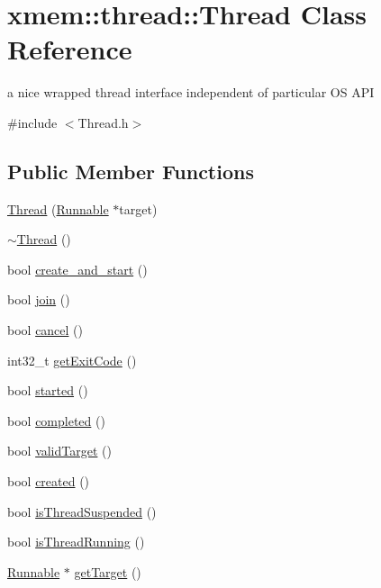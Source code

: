 \hypertarget{classxmem_1_1thread_1_1_thread}{\section{xmem\-:\-:thread\-:\-:Thread Class Reference}
\label{classxmem_1_1thread_1_1_thread}
}


a nice wrapped thread interface independent of particular O\-S A\-P\-I  




{\ttfamily \#include $<$Thread.\-h$>$}

\subsection*{Public Member Functions}
\begin{DoxyCompactItemize}
\item 
\hyperlink{classxmem_1_1thread_1_1_thread_a3248f8f92c293da9c20b78f443e61d76}{Thread} (\hyperlink{classxmem_1_1thread_1_1_runnable}{Runnable} $\ast$target)
\item 
\hyperlink{classxmem_1_1thread_1_1_thread_a37d9edd3a1a776cbc27dedff949c9726}{$\sim$\-Thread} ()
\item 
bool \hyperlink{classxmem_1_1thread_1_1_thread_a7550e894f4a83043fe4a4e93aee2def6}{create\-\_\-and\-\_\-start} ()
\item 
bool \hyperlink{classxmem_1_1thread_1_1_thread_a6d767b9746588b8be5f274f4da454b08}{join} ()
\item 
bool \hyperlink{classxmem_1_1thread_1_1_thread_a5d52b4357af2956e10fd72d80d540cf1}{cancel} ()
\item 
int32\-\_\-t \hyperlink{classxmem_1_1thread_1_1_thread_a6557774d3e8cf0bd92e8ba372cd23b85}{get\-Exit\-Code} ()
\item 
bool \hyperlink{classxmem_1_1thread_1_1_thread_a453a8b976b95c33d94b07fbca2ac414a}{started} ()
\item 
bool \hyperlink{classxmem_1_1thread_1_1_thread_a6d6ccbf6832d66803c6a527bad3943d8}{completed} ()
\item 
bool \hyperlink{classxmem_1_1thread_1_1_thread_ab91a2a9e8beb035106ba2d46ab32153c}{valid\-Target} ()
\item 
bool \hyperlink{classxmem_1_1thread_1_1_thread_a6a5f80bf0bca5ea5b18246aa2b1af250}{created} ()
\item 
bool \hyperlink{classxmem_1_1thread_1_1_thread_ab5c96a075727d5ffbec86213517a1795}{is\-Thread\-Suspended} ()
\item 
bool \hyperlink{classxmem_1_1thread_1_1_thread_afd810140b83b3a2ad90a425ea92dc366}{is\-Thread\-Running} ()
\item 
\hyperlink{classxmem_1_1thread_1_1_runnable}{Runnable} $\ast$ \hyperlink{classxmem_1_1thread_1_1_thread_a0cb4d94dd3f3d885794ce596a5198595}{get\-Target} ()
\end{DoxyCompactItemize}



